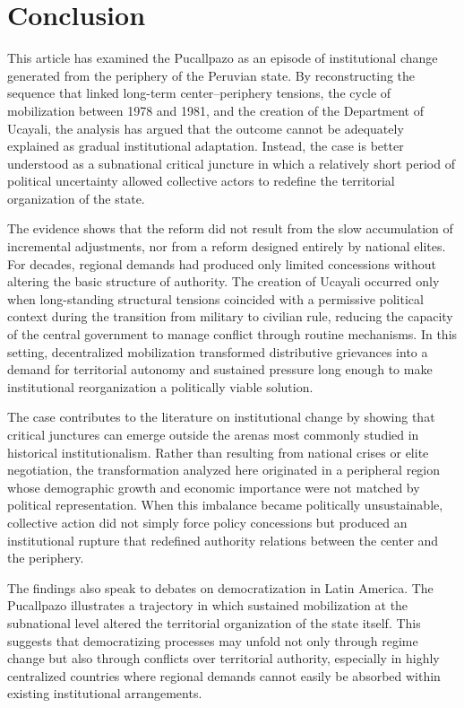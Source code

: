 \documentclass[12pt]{article}
\begin{document}
\section{Conclusion}

This article has examined the Pucallpazo as an episode of institutional
change generated from the periphery of the Peruvian state. By
reconstructing the sequence that linked long-term center--periphery
tensions, the cycle of mobilization between 1978 and 1981, and the
creation of the Department of Ucayali, the analysis has argued that the
outcome cannot be adequately explained as gradual institutional
adaptation. Instead, the case is better understood as a subnational
critical juncture in which a relatively short period of political
uncertainty allowed collective actors to redefine the territorial
organization of the state.

The evidence shows that the reform did not result from the slow
accumulation of incremental adjustments, nor from a reform designed
entirely by national elites. For decades, regional demands had produced
only limited concessions without altering the basic structure of
authority. The creation of Ucayali occurred only when long-standing
structural tensions coincided with a permissive political context during
the transition from military to civilian rule, reducing the capacity of
the central government to manage conflict through routine mechanisms.
In this setting, decentralized mobilization transformed distributive
grievances into a demand for territorial autonomy and sustained pressure
long enough to make institutional reorganization a politically viable
solution.

The case contributes to the literature on institutional change by showing
that critical junctures can emerge outside the arenas most commonly
studied in historical institutionalism. Rather than resulting from
national crises or elite negotiation, the transformation analyzed here
originated in a peripheral region whose demographic growth and economic
importance were not matched by political representation. When this
imbalance became politically unsustainable, collective action did not
simply force policy concessions but produced an institutional rupture
that redefined authority relations between the center and the periphery.

The findings also speak to debates on democratization in Latin America.
The Pucallpazo illustrates a trajectory in which sustained mobilization
at the subnational level altered the territorial organization of the
state itself. This suggests that democratizing processes may unfold not
only through regime change but also through conflicts over territorial
authority, especially in highly centralized countries where regional
demands cannot easily be absorbed within existing institutional
arrangements.
\end{document}
